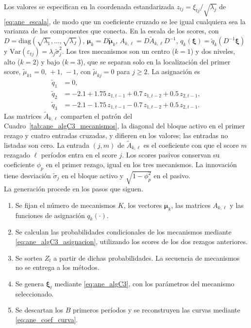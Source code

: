 Los valores se especifican en la coordenada estandarizada $z_{tj}=\xi_{tj}/\sqrt{\lambda_j}$ de \eqref{eq:ane_escala}, de modo que un coeficiente cruzado se lee igual cualquiera sea la varianza de las componentes que conecta. En la escala de los scores, con $D=\mathrm{diag}(\sqrt{\lambda_1},\ldots,\sqrt{\lambda_J})$, $\boldsymbol{\mu}_k=D\tilde{\boldsymbol{\mu}}_k$, $A_{k,\ell}=D\tilde{A}_{k,\ell}D^{-1}$, $q_k(\boldsymbol{\xi})=\tilde q_k(D^{-1}\boldsymbol{\xi})$ y $\mathrm{Var}(\varepsilon_{tj})=\lambda_j\tilde\sigma_j^{2}$. Los tres mecanismos son un centro ($k=1$) y dos niveles, alto ($k=2$) y bajo ($k=3$), que se separan solo en la localización del primer score, $\tilde\mu_{k1}=0,\,+1,\,-1$, con $\tilde\mu_{kj}=0$ para $j\ge2$. La asignación es
\begin{align}
\tilde q_1 &= 0, \nonumber\\
\tilde q_2 &= -2.1 + 1.75\,z_{1,t-1} + 0.7\,z_{1,t-2} + 0.5\,z_{2,t-1}, \label{eq:ane_algC3_q}\\
\tilde q_3 &= -2.1 - 1.75\,z_{1,t-1} - 0.7\,z_{1,t-2} + 0.5\,z_{2,t-1}. \nonumber
\end{align}
Las matrices $\tilde A_{k,\ell}$ comparten el patrón del Cuadro~\ref{tab:ane_algC3_mecanismos}, la diagonal del bloque activo en el primer rezago y cuatro entradas cruzadas, y difieren en los valores; las entradas no listadas son cero. La entrada $(j,m)$ de $\tilde A_{k,\ell}$ es el coeficiente con que el score $m$ rezagado $\ell$ períodos entra en el score $j$. Los scores pasivos conservan su coeficiente $\phi_p$ en el primer rezago, igual en los tres mecanismos. La innovación tiene desviación $\tilde\sigma_j$ en el bloque activo y $\sqrt{1-\phi_p^{2}}$ en el pasivo.\\

La generación procede en los pasos que siguen.
\begin{enumerate}
    \item Se fijan el número de mecanismos $K$, los vectores $\boldsymbol{\mu}_k$, las matrices $A_{k,\ell}$ y las funciones de asignación $q_k(\cdot)$.

    \item Se calculan las probabilidades condicionales de los mecanismos mediante \eqref{eq:ane_algC3_asignacion}, utilizando los scores de los dos rezagos anteriores.

    \item Se sortea $Z_t$ a partir de dichas probabilidades. La secuencia de mecanismos no se entrega a los métodos.

    \item Se genera $\boldsymbol{\xi}_t$ mediante \eqref{eq:ane_algC3}, con los parámetros del mecanismo seleccionado.

    \item Se descartan los $B$ primeros períodos y se reconstruyen las curvas mediante \eqref{eq:ane_coef_curva}.
\end{enumerate}

